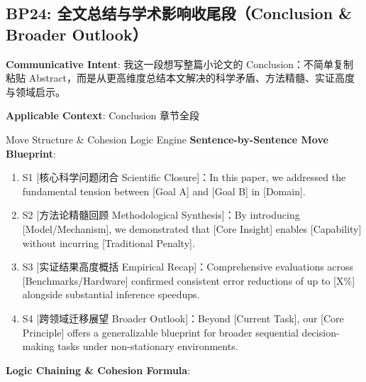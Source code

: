 \subsection{BP24: 全文总结与学术影响收尾段（Conclusion \& Broader Outlook）}\label{sec:bp:BP24}
\noindent\textbf{\color{AcadNavy}Communicative Intent}: 我这一段想写整篇小论文的 Conclusion：不简单复制粘贴 Abstract，而是从更高维度总结本文解决的科学矛盾、方法精髓、实证高度与领域启示。\par\vspace{2pt}
\noindent\textbf{\color{AcadSlate}Applicable Context}: Conclusion 章节全段\par\vspace{4pt}
\begin{ConceptBox}{Move Structure \& Cohesion Logic Engine}
\textbf{Sentence-by-Sentence Move Blueprint}:
\begin{enumerate}[label=\textbf{\color{AcadNavy}S\arabic*.}, leftmargin=2em, itemsep=2pt]
  \item S1 [核心科学问题闭合 Scientific Closure]：In this paper, we addressed the fundamental tension between [Goal A] and [Goal B] in [Domain].
  \item S2 [方法论精髓回顾 Methodological Synthesis]：By introducing [Model/Mechanism], we demonstrated that [Core Insight] enables [Capability] without incurring [Traditional Penalty].
  \item S3 [实证结果高度概括 Empirical Recap]：Comprehensive evaluations across [Benchmarks/Hardware] confirmed consistent error reductions of up to [X\%] alongside substantial inference speedups.
  \item S4 [跨领域迁移展望 Broader Outlook]：Beyond [Current Task], our [Core Principle] offers a generalizable blueprint for broader sequential decision-making tasks under non-stationary environments.
\end{enumerate}\par\vspace{4pt}
\textbf{Logic Chaining \& Cohesion Formula}:\par{}
\end{ConceptBox}
